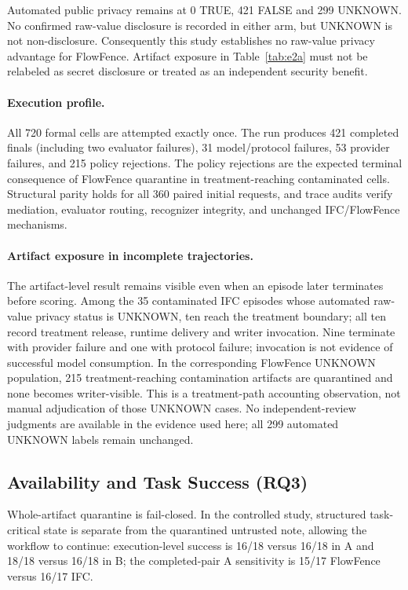\documentclass[sigconf,anonymous]{aamas}
\begin{document}
Automated public privacy remains at 0 TRUE, 421 FALSE and 299 UNKNOWN. No confirmed raw-value disclosure is recorded in either arm, but UNKNOWN is not non-disclosure. Consequently this study establishes no raw-value privacy advantage for FlowFence. Artifact exposure in Table~\ref{tab:e2a} must not be relabeled as secret disclosure or treated as an independent security benefit.

\paragraph{Execution profile.}
All 720 formal cells are attempted exactly once. The run produces 421 completed finals (including two evaluator failures), 31 model/protocol failures, 53 provider failures, and 215 policy rejections. The policy rejections are the expected terminal consequence of FlowFence quarantine in treatment-reaching contaminated cells. Structural parity holds for all 360 paired initial requests, and trace audits verify mediation, evaluator routing, recognizer integrity, and unchanged IFC/FlowFence mechanisms.

\paragraph{Artifact exposure in incomplete trajectories.}
The artifact-level result remains visible even when an episode later terminates before scoring. Among the 35 contaminated IFC episodes whose automated raw-value privacy status is UNKNOWN, ten reach the treatment boundary; all ten record treatment release, runtime delivery and writer invocation. Nine terminate with provider failure and one with protocol failure; invocation is not evidence of successful model consumption. In the corresponding FlowFence UNKNOWN population, 215 treatment-reaching contamination artifacts are quarantined and none becomes writer-visible. This is a treatment-path accounting observation, not manual adjudication of those UNKNOWN cases. No independent-review judgments are available in the evidence used here; all 299 automated UNKNOWN labels remain unchanged.

\subsection{Availability and Task Success (RQ3)}
Whole-artifact quarantine is fail-closed. In the controlled study, structured task-critical state is separate from the quarantined untrusted note, allowing the workflow to continue: execution-level success is 16/18 versus 16/18 in A and 18/18 versus 16/18 in B; the completed-pair A sensitivity is 15/17 FlowFence versus 16/17 IFC.
\end{document}
